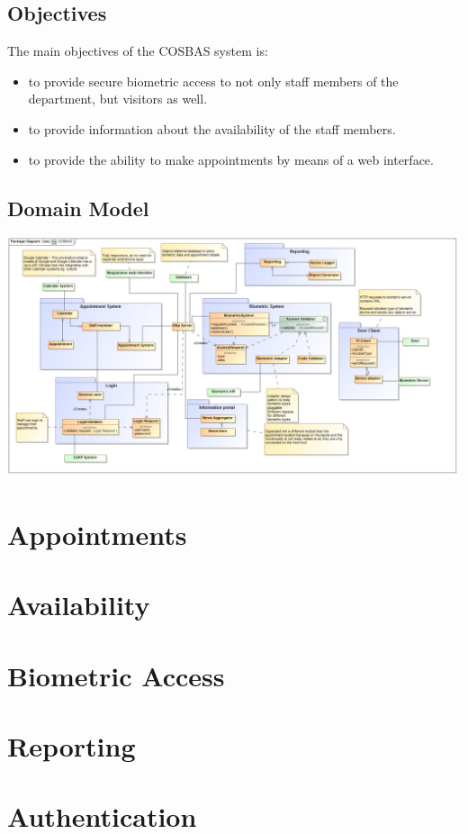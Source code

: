 \documentclass[11pt,a4paper,titlepage]{article}
\begin{document}
	\subsection{Objectives}
	The main objectives of the COSBAS system is:
	\begin{itemize}	
 		\item to provide secure biometric access to not only staff members of the department, but visitors as well.
		\item to provide information about the availability of the staff members.
		\item to provide the ability to make appointments by means of a web interface. 
	\end{itemize}

\begin{landscape}
	\section{Domain Model}	
	\includegraphics[width=\linewidth]{COSBAS_Domain}
	\end{landscape}
	
		
	\section{Appointments}
	
	
	
	\section{Availability}
	
		
	\section{Biometric Access}
	
	
	\section{Reporting}
	
	
	
	\newpage
	\section{Authentication}
	

	

	
\end{document}
